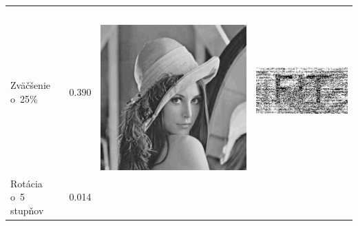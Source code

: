 \begin{table}[h]
\begin{tabular}{llcc}
\begin{minipage}[c]{.15\textwidth}
 \end{minipage} \\
Zväčšenie o~25\%                       & 0.390 &
\begin{minipage}[c]{.1\textwidth}
\ 
  \includegraphics[scale=0.1]{obrazky/scale125}
\end{minipage}
 &
 \begin{minipage}[c]{.15\textwidth}
   \includegraphics[scale=0.25]{obrazky/scale125-wm}
 \end{minipage} \\
Rotácia o~5 stupňov                    & 0.014 &
\begin{minipage}[c]{.1\textwidth}
\ 

\end{minipage}
\end{tabular}
\end{table}
